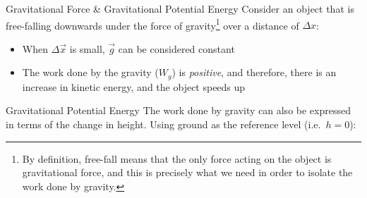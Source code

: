 \documentclass[12pt,compress,aspectratio=169]{beamer}
\begin{document}
\begin{frame}{Gravitational Force \& Gravitational Potential Energy}
  Consider an object that is free-falling downwards under the force of
  gravity\footnote{By definition, free-fall means that the only force acting on
  the object is gravitational force, and this is precisely what we need in
  order to isolate the work done by gravity.} over a distance of $\Delta x$:
  \begin{center}
  \end{center}
  \begin{itemize}
  \item When $\Delta\vec x$ is small, $\vec g$ can be considered constant
  \item The work done by the gravity ($W_g$) is \emph{positive}, and
    therefore, there is an increase in kinetic energy, and the object speeds up

  \end{itemize}
  \vspace{.2in}
\end{frame}



\begin{frame}{Gravitational Potential Energy}
  The work done by gravity can also be expressed in terms of the change in
  height. Using ground as the reference level (i.e.\ $h=0$):
  \begin{center}
  \end{center}

\end{frame}
\end{document}
